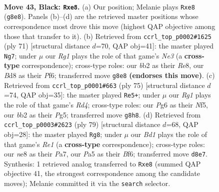 \documentclass[11pt]{article}
\begin{document}
\clearpage

\begin{figure}[p]\centering
\begin{subfigure}{0.46\textwidth}\centering
\resizebox{\linewidth}{!}{%
\newchessgame
\chessboard[
  setfen={r2bN1r1/1p5p/nk4pP/p3Pp2/P2p4/3R2P1/1B2N2K/R7 b - - 0 43},
  showmover=false,
  pgfstyle=straightmove, color=movearrow, markmove={g8-e8}
]}
\caption{}
\end{subfigure}\hfill
\begin{subfigure}{0.46\textwidth}\centering
\resizebox{\linewidth}{!}{%
\newchessgame
\chessboard[
  setfen={4r3/1p1r1k2/p1pPnp2/7P/5P1p/1PB2K2/P2R4/7R b - - 2 36},
  showmover=false,
  pgfstyle=straightmove, color=movearrow, markmove={e6-g7}
]}
\caption{}
\end{subfigure}
\\[4pt]
\begin{subfigure}{0.46\textwidth}\centering
\resizebox{\linewidth}{!}{%
\newchessgame
\chessboard[
  setfen={8/2p5/2R2pk1/1p1r1np1/p6p/2P2P2/PP1NK1PP/8 b - - 1 38},
  showmover=false,
  pgfstyle=straightmove, color=movearrow, markmove={d5-e5}
]}
\caption{}
\end{subfigure}\hfill
\begin{subfigure}{0.46\textwidth}\centering
\resizebox{\linewidth}{!}{%
\newchessgame
\chessboard[
  setfen={4r3/p1R5/1p2kb1p/3r3P/3p2p1/6P1/PP1R1P1N/5K2 b - - 3 40},
  showmover=false,
  pgfstyle=straightmove, color=movearrow, markmove={e8-g8}
]}
\caption{}
\end{subfigure}
\caption{\textbf{Move 43, Black: \texttt{Rxe8}.} (a) Our position; Melanie plays \texttt{Rxe8} (\texttt{g8e8}). Panels (b)--(d) are the retrieved master positions whose correspondence most drove this move (highest QAP objective among those that transfer to it). (b) Retrieved from \texttt{ccrl\_top\_p0002\#1625} (ply 71) [structural distance $d$=70, QAP obj=41]: the master played \texttt{Ng7}; under $\mu$ our \emph{Rg1} plays the role of that game's \emph{Ne3} (a \textbf{cross-type} correspondence); cross-type roles: our \emph{b}b2 as their \emph{R}e8, our \emph{B}d8 as their \emph{P}f6; transferred move \texttt{g8e8} \textbf{(endorses this move)}. (c) Retrieved from \texttt{ccrl\_top\_p0001\#663} (ply 75) [structural distance $d$=74, QAP obj=35]: the master played \texttt{Re5+}; under $\mu$ our \emph{Rg1} plays the role of that game's \emph{Rd4}; cross-type roles: our \emph{P}g6 as their \emph{N}f5, our \emph{b}b2 as their \emph{P}g5; transferred move \texttt{g8h8}. (d) Retrieved from \texttt{ccrl\_top\_p0003\#2623} (ply 79) [structural distance $d$=68, QAP obj=28]: the master played \texttt{Rg8}; under $\mu$ our \emph{Bd1} plays the role of that game's \emph{Re1} (a \textbf{cross-type} correspondence); cross-type roles: our \emph{n}e8 as their \emph{P}a7, our \emph{P}a5 as their \emph{B}f6; transferred move \texttt{d8e7}. Synthesis: 1 retrieved analog transferred to \texttt{Rxe8} (summed QAP objective 41, the strongest correspondence among the candidate moves); Melanie committed it via the \texttt{search} selector.}
\label{fig:thought-m85}
\end{figure}
\end{document}
